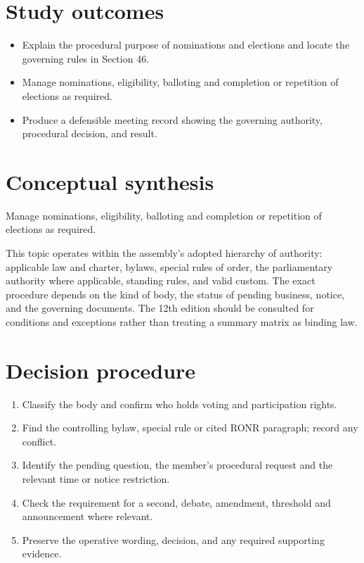 \documentclass[11pt]{article}
\begin{document}
\SuiteOpen
{}
\section{Study outcomes}
\begin{itemize}[leftmargin=*,itemsep=4pt]
\item Explain the procedural purpose of nominations and elections and locate the governing rules in Section 46.
\item Manage nominations, eligibility, balloting and completion or repetition of elections as required.
\item Produce a defensible meeting record showing the governing authority, procedural decision, and result.
\end{itemize}

\section{Conceptual synthesis}
Manage nominations, eligibility, balloting and completion or repetition of elections as required.

This topic operates within the assembly’s adopted hierarchy of authority: applicable law and charter, bylaws, special rules of order, the parliamentary authority where applicable, standing rules, and valid custom. The exact procedure depends on the kind of body, the status of pending business, notice, and the governing documents. The 12th edition should be consulted for conditions and exceptions rather than treating a summary matrix as binding law.
\section{Decision procedure}
\begin{enumerate}[leftmargin=*,itemsep=4pt]
\item Classify the body and confirm who holds voting and participation rights.
\item Find the controlling bylaw, special rule or cited RONR paragraph; record any conflict.
\item Identify the pending question, the member’s procedural request and the relevant time or notice restriction.
\item Check the requirement for a second, debate, amendment, threshold and announcement where relevant.
\item Preserve the operative wording, decision, and any required supporting evidence.
\end{enumerate}
\end{document}
